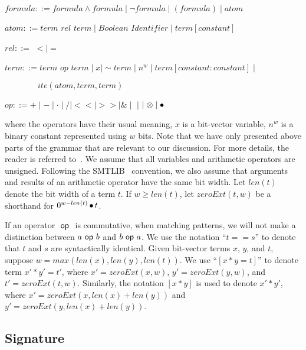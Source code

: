 \vspace{0.2 cm}

$formula ::= formula \land formula \mid \lnot formula \mid (formula) \mid atom$

$atom ::= term$ $rel$ $term \mid Boolean$ $Identifier \mid term[constant]$ 

$rel ::= $ $< \mid =$

$term ::= term$ $op$ $term \mid x \mid \sim term \mid n^w \mid term[constant:constant] \mid$

$\qquad \qquad ite(atom, term, term)$

$op ::= + \mid - \mid \cdot \mid / \mid << \mid >> \mid \& \mid $ $\mid$ $\mid \otimes \mid \mathop{\bullet}$

\vspace{0.2 cm}

\noindent where the operators have their usual meaning, $x$ is a bit-vector variable, $n^w$ is a binary constant
represented using $w$ bits.
%
Note that we have only presented above parts of the grammar
that are relevant to our discussion.  For more details,
the reader is referred to~\cite{Kroeningbook,barrett}.
%
We assume that all variables and arithmetic operators are unsigned.
Following the SMTLIB~\cite{SMTLIB} convention, we also assume that
arguments and results of an arithmetic operator have the same bit width.
%
Let $len(t)$ denote the bit width of a term $t$.
%
If $w \geq len(t)$,
let $zeroExt(t,w)$ be a shorthand for  $0^{w-len(t)}\mathop{\bullet} t$.

If an operator $~\mathsf{op}~$ is commutative, when matching patterns, we will
not make a distinction between $a ~\mathsf{op}~ b$ and $b ~\mathsf{op}~ a$.
%
We use the notation ``$t == s$'' to denote that $t$ and $s$ are
syntactically identical.
%
Given bit-vector terms $x$, $y$, and $t$, suppose $w = max(len(x),len(y),
len(t))$.
%
We use ``$[x*y = t]$'' to denote term $x'*y'=t'$, where $x' =
zeroExt(x, w)$, $y' = zeroExt(y, w)$, and $t' = zeroExt(t, w)$.
%
Similarly, the notation $[x*y]$ is used to denote $x' * y'$, where $x'
= zeroExt(x, len(x)+len(y))$ and $y' = zeroExt(y, len(x) + len(y))$.


%

\subsection{Signature}

